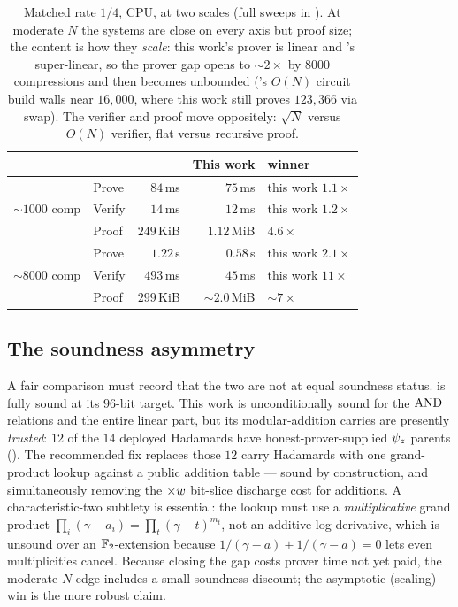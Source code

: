 \begin{table}[h]
\centering
\renewcommand{\arraystretch}{1.2}
\begin{tabular}{@{}llrrl@{}}
\toprule
& & \binius{} & This work & winner \\
\midrule
\multirow{3}{*}{$\sim$$1000$ comp}
  & Prove   & $84$\,ms    & $75$\,ms    & this work $1.1\times$ \\
  & Verify  & $14$\,ms    & $12$\,ms    & this work $1.2\times$ \\
  & Proof   & $249$\,KiB  & $1.12$\,MiB & \binius{} $4.6\times$ \\
\midrule
\multirow{3}{*}{$\sim$$8000$ comp}
  & Prove   & $1.22$\,s   & $0.58$\,s   & this work $2.1\times$ \\
  & Verify  & $493$\,ms   & $45$\,ms    & this work $11\times$ \\
  & Proof   & $299$\,KiB  & $\sim$$2.0$\,MiB & \binius{} $\sim$$7\times$ \\
\bottomrule
\end{tabular}
\caption{Matched rate $1/4$, CPU, at two scales (full sweeps in ).
At moderate $N$ the systems are close on every axis but proof size; the content
is how they \emph{scale}: this work's prover is linear and \binius{}'s
super-linear, so the prover gap opens to $\sim$$2\times$ by $8000$ compressions
and then becomes unbounded (\binius{}'s $O(N)$ circuit build walls near
$16{,}000$, where this work still proves $123{,}366$ via swap). The verifier and
proof move oppositely: $\sqrt N$ versus $O(N)$ verifier, flat versus recursive
proof.}
\label{tab:headline}
\end{table}

\subsection{The soundness asymmetry}
\label{sec:cmp-soundness}

A fair comparison must record that the two are not at equal soundness status.
\binius{} is fully sound at its $96$-bit target. This work is unconditionally
sound for the $\operatorname{AND}$ relations and the entire linear part, but its
modular-addition carries are presently \emph{trusted}: $12$ of the $14$ deployed
Hadamards have honest-prover-supplied $\psi_{z}$ parents ().
The recommended fix replaces those $12$ carry Hadamards with one grand-product
lookup against a public addition table \cite{lasso} --- sound by construction,
and simultaneously removing the $\times w$ bit-slice discharge cost for
additions. A characteristic-two subtlety is essential: the lookup must use a
\emph{multiplicative} grand product $\prod_i(\gamma-a_i) = \prod_t(\gamma-t)^{m_t}$,
not an additive log-derivative, which is unsound over an $\mathbb{F}_2$-extension because
$1/(\gamma-a)+1/(\gamma-a) = 0$ lets even multiplicities cancel. Because closing
the gap costs prover time not yet paid, the moderate-$N$ edge includes a small
soundness discount; the asymptotic (scaling) win is the more robust claim.

